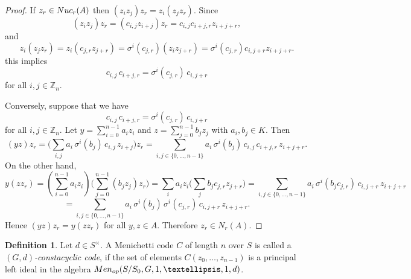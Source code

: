 \documentclass[11pt]{amsart}
\theoremstyle{plain}
\theoremstyle{definition}
\newtheorem{definition}[theorem]{Definition}
\begin{document}
\begin{proof}
If
$z_r\in {\rm Nuc}_r(A)$ then $(z_i z_j)z_r=z_i(z_j z_r)$. Since
\[
(z_i z_j) z_r
= (c_{i,j} z_{i+j}) z_r
= c_{i,j} c_{i+j,r} z_{i+j+r},
\]
and
\[
z_i (z_j z_r)
= z_i (c_{j,r} z_{j+r})
= \sigma^i(c_{j,r}) ( z_i z_{j+r})
= \sigma^i(c_{j,r}) c_{i,j+r}  z_{i+j+r}.
\]
this implies
\[
c_{i,j}\,c_{i+j,r} = \sigma^{i}(c_{j,r})\,c_{i,j+r}
\]
for all $ i,j\in \mathbb{Z}_n$.



Conversely, suppose that we have
\[
c_{i,j}\,c_{i+j,r} = \sigma^{i}(c_{j,r})\,c_{i,j+r}
\]
 for all $i,j\in \mathbb{Z}_n$.  Let $y=\sum_{i=0}^{n-1} a_i z_i$ and $z=\sum_{j=0}^{n-1} b_j z_j$ with $a_i,b_j\in K$.
Then
\[
(y z) z_r
 = \Big(\sum_{i,j} a_i\,\sigma^i(b_j)\,c_{i,j}\,z_{i+j}\Big) z_r
 = \sum_{i,j\in\{0,\dots, n-1\}} a_i\,\sigma^i(b_j)\,c_{i,j}\,c_{i+j,r}\, z_{i+j+r}.
\]
On the other hand,
\[
y (z z_r)
=(\sum_{i=0}^{n-1} a_i z_i) \Big(\sum_{j=0}^{n-1} (b_j z_j)z_r\Big)
 = \sum_i a_i z_i \Big(\sum_j b_j c_{j,r} z_{j+r}\Big)
 = \sum_{i,j\in\{0,\dots, n-1\}} a_i\,\sigma^i(b_j c_{j,r})\,c_{i,j+r}\, z_{i+j+r}
\]
$$ = \sum_{i,j\in\{0,\dots, n-1\} } a_i\,\sigma^i(b_j)\,\sigma^i(c_{j,r})\,c_{i,j+r}\, z_{i+j+r}.$$
Hence $(y z) z_r = y (z z_r)$ for all $y,z\in A$.  Therefore $z_r\in N_r(A)$.
\end{proof}


\begin{definition}
 Let $d\in S^\times$. A Menichetti code $C$  of length $n$ over $S$ is called a \emph{$(G,d)$-constacyclic code}, if the set of elements $C(z_0,\dots,z_{n-1})$ is a principal left ideal in the algebra
 ${\rm Men}_{op}(S/S_0,G, 1,\dots,1,d)$.
  \end{definition}
\end{document}
